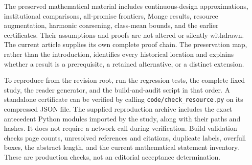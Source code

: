 The preserved mathematical material includes continuous-design approximations, institutional comparisons, all-promise frontiers, Monge results, resource augmentation, harmonic coarsening, class-mean bounds, and the earlier certificates. Their assumptions and proofs are not altered or silently withdrawn. The current article supplies its own complete proof chain. The preservation map, rather than the introduction, identifies every historical location and explains whether a result is a prerequisite, a retained alternative, or a distinct extension.

To reproduce from the revision root, run the regression tests, the complete fixed study, the reader generator, and the build-and-audit script in that order. A standalone certificate can be verified by calling \texttt{code/check\_resource.py} on its compressed JSON file. The supplied reproduction archive includes the exact antecedent Python modules imported by the study, along with their paths and hashes. It does not require a network call during verification. Build validation checks page counts, unresolved references and citations, duplicate labels, overfull boxes, the abstract length, and the current mathematical statement inventory. These are production checks, not an editorial acceptance determination.
